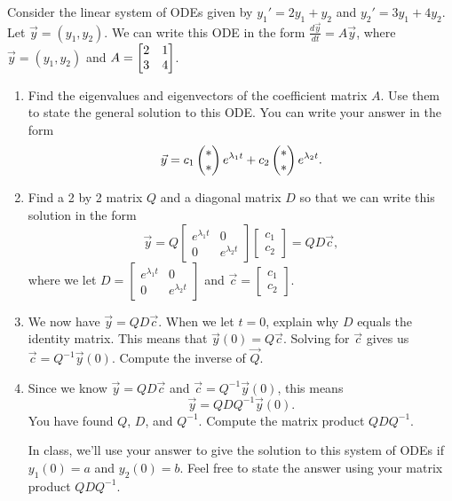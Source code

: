 \begin{problem}
 Consider the linear system of ODEs given by $y_1'=2y_1+y_2$ and $y_2'=3y_1+4y_2$. Let $\vec y = (y_1,y_2)$. We can write this ODE in the form $\frac{d\vec y}{dt} = A\vec y$, where $\vec y = (y_1,y_2)$ and $A = \begin{bmatrix} 2&1\\3&4 \end{bmatrix}$.  
 \begin{enumerate}
  \item Find the eigenvalues and eigenvectors of the coefficient matrix $A$. Use them to state the general solution to this ODE. You can write your answer in the form 
$$
\vec y=
c_1\begin{pmatrix} * \\ *  \end{pmatrix} e^{\lambda_1 t }+c_2\begin{pmatrix} * \\ *  \end{pmatrix} e^{\lambda_2 t}.
$$
\item {}%
Find a 2 by 2 matrix $Q$ and a diagonal matrix $D$ so that we can write this solution in the form 
$$
\vec y=
Q\begin{bmatrix}
 e^{\lambda_1 t} & 0\\
 0 & e^{\lambda_2 t}
\end{bmatrix}
\begin{bmatrix}
c_1\\c_2 
\end{bmatrix}
=QD\vec c,
$$
where we let $D=
\begin{bmatrix}
 e^{\lambda_1 t} & 0\\
 0 & e^{\lambda_2 t}
\end{bmatrix}$ 
and 
$\vec c =
\begin{bmatrix}
c_1\\c_2 
\end{bmatrix}
$.
\item We now have $\vec y = QD\vec c$. When we let $t=0$, explain why $D$ equals the identity matrix. This means that $\vec y(0) = Q\vec c$.  Solving for $\vec c$ gives us $\vec c= Q^{-1}\vec y(0)$.  Compute the inverse of $\vec Q$.
\item 
Since we know $\vec y = QD\vec c$ and $\vec c= Q^{-1}\vec y(0)$, this means 
$$\vec y = QDQ^{-1}\vec y(0).$$
You have found $Q$, $D$, and $Q^{-1}$. Compute the matrix product $QDQ^{-1}$. 

In class, we'll use your answer to give the solution to this system of ODEs if $y_1(0)=a$ and $y_2(0)=b$.  Feel free to state the answer using your matrix product $QDQ^{-1}$.  
\end{enumerate}

\end{problem}

